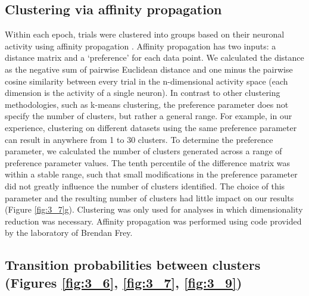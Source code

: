 \subsection{Clustering via affinity propagation} \label{methods:clustering_affinity}
Within each epoch, trials were clustered into groups based on their neuronal activity using affinity propagation \citep{Frey:2007tj}. Affinity propagation has two inputs: a distance matrix and a ‘preference’ for each data point. We calculated the distance as the negative sum of pairwise Euclidean distance and one minus the pairwise cosine similarity between every trial in the n-dimensional activity space (each dimension is the activity of a single neuron). In contrast to other clustering methodologies, such as k-means clustering, the preference parameter does not specify the number of clusters, but rather a general range. For example, in our experience, clustering on different datasets using the same preference parameter can result in anywhere from 1 to 30 clusters. To determine the preference parameter, we calculated the number of clusters generated across a range of preference parameter values. The tenth percentile of the difference matrix was within a stable range, such that small modifications in the preference parameter did not greatly influence the number of clusters identified. The choice of this parameter and the resulting number of clusters had little impact on our results (Figure \ref{fig:3_7}g). Clustering was only used for analyses in which dimensionality reduction was necessary. Affinity propagation was performed using code provided by the laboratory of Brendan Frey.

\subsection[Transition probabilities between clusters]{Transition probabilities between clusters (Figures \ref{fig:3_6}, \ref{fig:3_7}, \ref{fig:3_9})} \label{methods:clustering_trans_prob}

